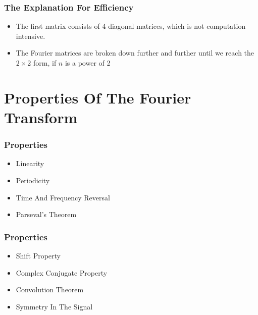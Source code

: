 \documentclass{beamer}
\begin{document}
\begin{frame}
	\frametitle{The Explanation For Efficiency}
	\begin{itemize}
		\item The first matrix consists of 4 diagonal matrices, which is not computation intensive.
		\item The Fourier matrices are broken down further and further until we reach the $2 \times 2$ form, if $n$ is a power of 2
	\end{itemize}
\end{frame}
\section{Properties Of The Fourier Transform}
\begin{frame}
	\frametitle{Properties}
	\begin{itemize}
		\item Linearity
		\item Periodicity
		\item Time And Frequency Reversal
		\item Parseval's Theorem
	\end{itemize}
\end{frame}
\begin{frame}
	\frametitle{Properties}
	\begin{itemize}
	\item Shift Property
	\item Complex Conjugate Property
	\item Convolution Theorem
	\item Symmetry In The Signal
	\end{itemize}

\end{frame}
\end{document}
